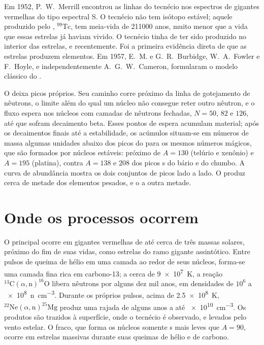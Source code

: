 \begin{history}
Em 1952, P.~W.~Merrill encontrou as linhas do tecnécio nos espectros de
gigantes vermelhas do tipo espectral S. O tecnécio não tem isótopo estável; aquele
produzido pelo , $^{99}\mathrm{Tc}$, tem meia-vida de
\num{211000} anos, muito menor que a vida que essas estrelas
já haviam vivido. O tecnécio tinha de ter sido produzido no interior das estrelas, e
recentemente. Foi a primeira evidência direta de que as estrelas produzem elementos. Em
1957, E.~M. e G.~R.~Burbidge, W.~A.~Fowler e F.~Hoyle, e
independentemente A.~G.~W.~Cameron, formularam o modelo clássico do
.
\end{history}

O  deixa picos próprios. Seu caminho corre próximo da linha de
gotejamento de nêutrons, o limite além do qual um núcleo não consegue reter
outro nêutron, e o fluxo espera nos núcleos com camadas de nêutrons fechadas, $N = 50$, $82$ e
$126$, até que sofram decaimento beta. Esses pontos de espera acumulam material;
após os decaimentos finais até a estabilidade, os acúmulos situam-se em números de massa algumas
unidades abaixo dos picos do  para os mesmos números mágicos, que
são formados por núcleos estáveis: próximo de $A = 130$ (telúrio e xenônio) e
$A = 195$ (platina), contra $A = 138$ e $208$ dos picos s do
bário e do chumbo. A curva de abundância mostra os dois conjuntos de picos lado a
lado. O  produz cerca de metade dos elementos pesados, e o 
a outra metade.

\section{Onde os processos ocorrem}\label{sec:b3:origin-of-elements:sites}

O  principal ocorre em gigantes vermelhas de até cerca de três massas
solares, próximo do fim de suas vidas, como estrelas do ramo gigante assintótico. Entre
pulsos de queima de hélio em uma camada ao redor de seus núcleos, forma-se uma camada fina
rica em carbono-13; a cerca de \qty{9e7}{K}, a reação
$^{13}\mathrm{C}(\alpha,\mathrm{n})^{16}\mathrm{O}$ libera nêutrons
por alguns dez mil anos, em densidades de $10^6$ a
\qty{e8}{n.cm^{-3}}. Durante os próprios pulsos, acima de
\qty{2.5e8}{K}, $^{22}\mathrm{Ne}(\alpha,\mathrm{n})^{25}\mathrm{Mg}$
produz uma rajada de alguns anos a até \qty{e10}{cm^{-3}}. Os produtos
são trazidos à superfície, onde o tecnécio é observado, e levados
pelo vento estelar. O  fraco, que forma os núcleos somente s
mais leves que $A = 90$, ocorre em estrelas massivas durante suas queimas
de hélio e de carbono.

